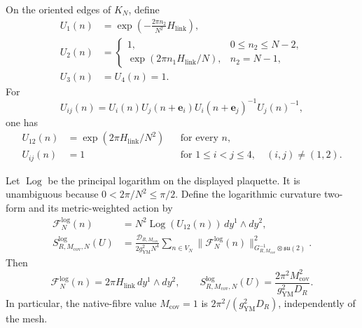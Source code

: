 \begin{theorem}
\label{cusp-link-flux-theorem}
On the oriented edges of \(K_N\), define
\begin{align}
 U_1(n)&=\exp\left(-\frac{2\pi n_2}{N^2}H_{\mathrm{link}}\right),
 \label{cusp-link-flux-u1}\\
 U_2(n)&=
 \begin{cases}
  1,&0\leq n_2\leq N-2,\\[1mm]
  \exp(2\pi n_1H_{\mathrm{link}}/N),&n_2=N-1,
 \end{cases}
 \label{cusp-link-flux-u2}\\
 U_3(n)&=U_4(n)=1.
 \label{cusp-link-flux-u34}
\end{align}
For
\begin{equation}
 U_{ij}(n)=U_i(n)U_j(n+\mathbf e_i)
            U_i(n+\mathbf e_j)^{-1}U_j(n)^{-1},
 \label{cusp-link-plaquette-convention}
\end{equation}
one has
\begin{equation}
 \begin{aligned}
 U_{12}(n)&=\exp(2\pi H_{\mathrm{link}}/N^2)
 &&\text{for every }n,\\
 U_{ij}(n)&=1
 &&\text{for }1\leq i<j\leq4,\quad(i,j)\neq(1,2).
 \end{aligned}
 \label{cusp-link-plaquette-values}
\end{equation}

Let \(\operatorname{Log}\) be the principal logarithm on the displayed
plaquette.  It is unambiguous because \(0<2\pi/N^2\leq\pi/2\).  Define
the logarithmic curvature two-form and its metric-weighted action by
\begin{align}
 \mathcal F_N^{\log}(n)
 &=N^2\operatorname{Log}(U_{12}(n))\,dy^1\wedge dy^2,
 \label{cusp-link-log-curvature}\\
 S^{\log}_{R,M_{\mathrm{cov}},N}(U)
 &=\frac{\mathcal D_{R,M_{\mathrm{cov}}}}{2g_{\mathrm{YM}}^2N^4}
   \sum_{n\in V_N}
   \lVert\mathcal F_N^{\log}(n)\rVert^2_{
       G_{R,M_{\mathrm{cov}}}^{-1}\otimes\mathfrak{su}(2)}.
 \label{cusp-link-log-action}
\end{align}
Then
\begin{equation}
 \mathcal F_N^{\log}(n)=2\pi H_{\mathrm{link}}\,dy^1\wedge dy^2,
 \qquad
 S^{\log}_{R,M_{\mathrm{cov}},N}(U)
 =\frac{2\pi^2M_{\mathrm{cov}}^2}{g_{\mathrm{YM}}^2D_R}.
 \label{cusp-link-log-action-value}
\end{equation}
In particular, the native-fibre value \(M_{\mathrm{cov}}=1\) is
\(2\pi^2/(g_{\mathrm{YM}}^2D_R)\), independently of the mesh.


\end{theorem}
